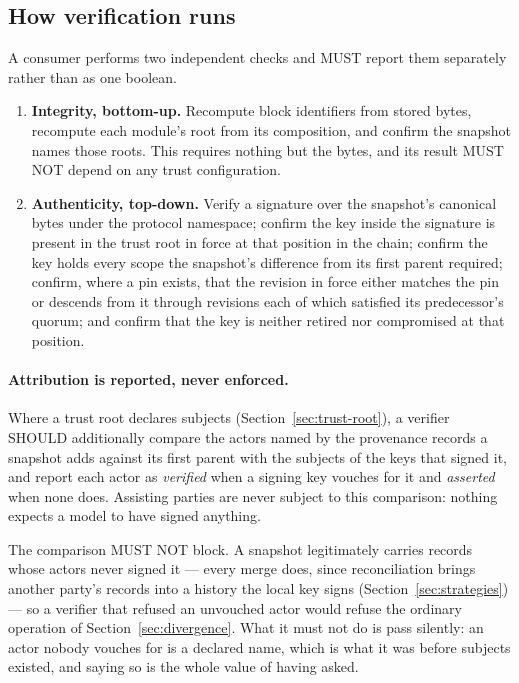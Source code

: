 \documentclass[11pt,a4paper]{article}
\begin{document}
\subsection{How verification runs}
\label{sec:verification}

A consumer performs two independent checks and MUST report them separately
rather than as one boolean.

\begin{enumerate}[leftmargin=1.6em]
  \item \textbf{Integrity, bottom-up.} Recompute block identifiers from stored
  bytes, recompute each module's root from its composition, and confirm the
  snapshot names those roots. This requires nothing but the bytes, and its
  result MUST NOT depend on any trust configuration.
  \item \textbf{Authenticity, top-down.} Verify a signature over the snapshot's
  canonical bytes under the protocol namespace; confirm the key inside the
  signature is present in the trust root in force at that position in the chain;
  confirm the key holds every scope the snapshot's difference from its first
  parent required; confirm, where a pin exists, that the revision in force either matches the pin
or descends from it through revisions each of which satisfied its
predecessor's quorum; and confirm that the key is neither retired nor
compromised at that position.
\end{enumerate}

\paragraph{Attribution is reported, never enforced.}
Where a trust root declares subjects (Section~\ref{sec:trust-root}), a verifier
SHOULD additionally compare the actors named by the provenance records a
snapshot adds against its first parent with the subjects of the keys that signed
it, and report each actor as \emph{verified} when a signing key vouches for it
and \emph{asserted} when none does. Assisting parties are never subject to this
comparison: nothing expects a model to have signed anything.

The comparison MUST NOT block. A snapshot legitimately carries records whose
actors never signed it --- every merge does, since reconciliation brings another
party's records into a history the local key signs
(Section~\ref{sec:strategies}) --- so a verifier that refused an unvouched
actor would refuse the ordinary operation of Section~\ref{sec:divergence}. What
it must not do is pass silently: an actor nobody vouches for is a declared name,
which is what it was before subjects existed, and saying so is the whole value
of having asked.
\end{document}

